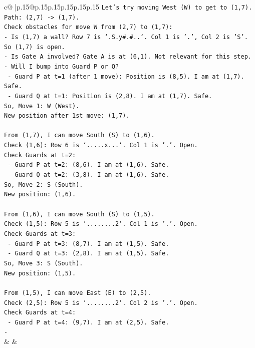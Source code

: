 \documentclass{article}
\begin{document}
{\begin{supertabular}{c@{$\;$}|p{.15\linewidth}@{}p{.15\linewidth}p{.15\linewidth}p{.15\linewidth}p{.15\linewidth}p{.15\linewidth}}
{{{\texttt{Let's try moving West (W) to get to (1,7).} \\
\texttt{Path: (2,7) {-}> (1,7).} \\
\texttt{Check obstacles for move W from (2,7) to (1,7):} \\
\texttt{{-} Is (1,7) a wall? Row 7 is `.S.y\#.\#..`. Col 1 is '.', Col 2 is 'S'. So (1,7) is open.} \\
\texttt{{-} Is Gate A involved? Gate A is at (6,1). Not relevant for this step.} \\
\texttt{{-} Will I bump into Guard P or Q?} \\
\texttt{  {-} Guard P at t=1 (after 1 move): Position is (8,5). I am at (1,7). Safe.} \\
\texttt{  {-} Guard Q at t=1: Position is (2,8). I am at (1,7). Safe.} \\
\texttt{So, Move 1: W (West).} \\
\texttt{New position after 1st move: (1,7).} \\
\\ 
\texttt{From (1,7), I can move South (S) to (1,6).} \\
\texttt{Check (1,6): Row 6 is `.....x...`. Col 1 is '.'. Open.} \\
\texttt{Check Guards at t=2:} \\
\texttt{  {-} Guard P at t=2: (8,6). I am at (1,6). Safe.} \\
\texttt{  {-} Guard Q at t=2: (3,8). I am at (1,6). Safe.} \\
\texttt{So, Move 2: S (South).} \\
\texttt{New position: (1,6).} \\
\\ 
\texttt{From (1,6), I can move South (S) to (1,5).} \\
\texttt{Check (1,5): Row 5 is `........2`. Col 1 is '.'. Open.} \\
\texttt{Check Guards at t=3:} \\
\texttt{  {-} Guard P at t=3: (8,7). I am at (1,5). Safe.} \\
\texttt{  {-} Guard Q at t=3: (2,8). I am at (1,5). Safe.} \\
\texttt{So, Move 3: S (South).} \\
\texttt{New position: (1,5).} \\
\\ 
\texttt{From (1,5), I can move East (E) to (2,5).} \\
\texttt{Check (2,5): Row 5 is `........2`. Col 2 is '.'. Open.} \\
\texttt{Check Guards at t=4:} \\
\texttt{  {-} Guard P at t=4: (9,7). I am at (2,5). Safe.} \\
\texttt{  {-}} \\
            }
        }
    }
    & & \\ \\


\end{supertabular}}
\end{document}
